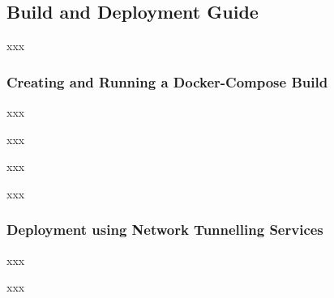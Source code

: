 \subsection{Build and Deployment Guide}
\label{subsec:build_deploy}
xxx

\subsubsection{Creating and Running a Docker-Compose Build}
\label{subsubsec:docker_build}
xxx

xxx

xxx

xxx

\subsubsection{Deployment using Network Tunnelling Services}
\label{subsubsec:deploymeny_tunnel}
xxx

xxx